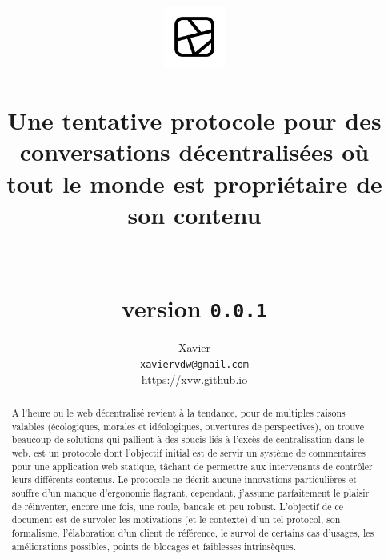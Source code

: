 \documentclass[a4paper,10pt]{article}
\title{
  \includegraphics[width=2cm]{../iconography/phragment-black.png}\\
  \bsc{Phragment}\\
  \large{
    Une tentative protocole pour des conversations décentralisées
    où tout le monde est propriétaire de son contenu\\~\\~\\
    \textbf{version} \texttt{0.0.1}
  }
}
\date{}
\author{
  Xavier \bsc{Van de Woestyne}\\
  \texttt{xaviervdw@gmail.com}\\
  \small{https://xvw.github.io}
}
\begin{document}
\maketitle

\begin{abstract}
  A l'heure ou le web décentralisé revient à la tendance, pour de multiples
  raisons valables (écologiques, morales et idéologiques, ouvertures de
  perspectives), on trouve beaucoup de solutions qui pallient à des soucis
  liés à l'excès de centralisation dans le web.  est un
  protocole dont l'objectif initial est de servir un système de commentaires
  pour une application web statique, tâchant de permettre aux intervenants
  de contrôler leurs différents contenus. Le protocole ne décrit aucune
  innovations particulières et souffre d'un manque d'ergonomie flagrant,
  cependant, j'assume parfaitement le plaisir de réinventer, encore une fois,
  une roule, bancale et peu robust. L'objectif de ce document est de survoler
  les motivations (et le contexte) d'un tel protocol, son formalisme,
  l'élaboration d'un client de référence, le survol de certains cas d'usages,
  les améliorations possibles, points de blocages et faiblesses intrinsèques.
\end{abstract}


\newpage


\end{document}
